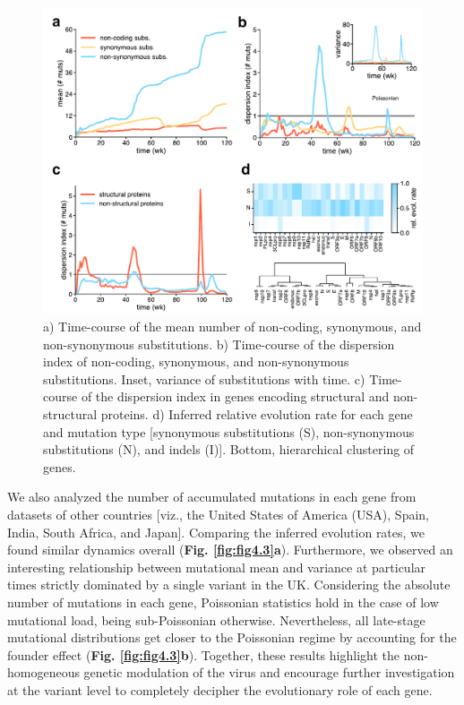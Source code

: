 \begin{figure}[ht!]
    \centering
    \includegraphics[width=\linewidth]{assets/Ch4Fig2.pdf}
    \caption{a) Time-course of the mean number of non-coding, synonymous, and non-synonymous substitutions. b) Time-course of the dispersion index of non-coding, synonymous, and non-synonymous substitutions. Inset, variance of substitutions with time. c) Time-course of the dispersion index in genes encoding structural and non-structural proteins. d) Inferred relative evolution rate for each gene and mutation type [synonymous substitutions (S), non-synonymous substitutions (N), and indels (I)]. Bottom, hierarchical clustering of genes.}\label{fig:fig4.2}
\end{figure}

We also analyzed the number of accumulated mutations in each gene from datasets of other countries [viz., the United States of America (USA), Spain, India, South Africa, and Japan]. Comparing the inferred evolution rates, we found similar dynamics overall (\textbf{Fig. \ref{fig:fig4.3}a}). Furthermore, we observed an interesting relationship between mutational mean and variance at particular times strictly dominated by a single variant in the UK. Considering the absolute number of mutations in each gene, Poissonian statistics hold in the case of low mutational load, being sub-Poissonian otherwise. Nevertheless, all late-stage mutational distributions get closer to the Poissonian regime by accounting for the founder effect (\textbf{Fig. \ref{fig:fig4.3}b}). Together, these results highlight the non-homogeneous genetic modulation of the virus and encourage further investigation at the variant level to completely decipher the evolutionary role of each gene.

